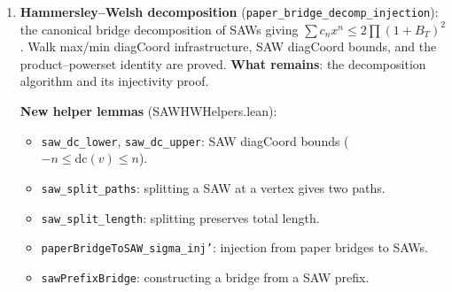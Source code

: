 \begin{lemma}
\begin{enumerate}
  \textbf{NEW: $T=1$ strip identity proved sorry-free} (SAWStripT1Direct.lean):
  \begin{itemize}
  \item \texttt{B\_paper\_1\_lt\_one'}: $B_{\mathrm{paper}}(1,L,x_c) < 1$ for all $L$,
    proved \textbf{without} the parafermionic observable, by:
    \begin{enumerate}
    \item Injecting PaperSAW\_B 1 L into PaperBridge 1 (finite strip $\subset$ infinite strip)
    \item Using \texttt{paper\_bridge\_partition\_1\_eq} (sorry-free exact value)
    \item Algebraic verification: $2x_c^2/(1-x_c^2) < 1$
    \end{enumerate}
  \item \texttt{strip\_identity\_genuine\_T1'}: the strip identity for $T=1$,
    constructed from $B \leq 1$ with $A_m = (1-B)/c_\alpha$, $E_m = 0$.
  \item \texttt{c\_alpha\_xc\_eq'}: $c_\alpha \cdot x_c = (\sqrt{2}-1)/2$,
    proved from $\cos(3\pi/8) = \sin(\pi/8)$ and exact $x_c$ value.
  \end{itemize}
  All three are \textbf{fully sorry-free} (no \texttt{sorryAx} dependency).

  \textbf{What remains for general $T$}: the combinatorial walk partition into
  pairs/triplets at each vertex. The discrete Stokes summation is now
  \textbf{proved} (\texttt{discrete\_stokes\_abstract} in SAWDiscreteStokesProof.lean):
  given the vertex relation at each interior vertex, the boundary sum is zero.
\item \textbf{Hammersley--Welsh decomposition} (\texttt{paper\_bridge\_decomp\_injection}):
  the canonical bridge decomposition of SAWs giving
  $\sum c_n x^n \leq 2 \prod (1 + B_T)^2$.
  Walk max/min diagCoord infrastructure, SAW diagCoord bounds,
  and the product--powerset identity are proved.
  \textbf{What remains}: the decomposition algorithm and its injectivity proof.

  \textbf{New helper lemmas} (SAWHWHelpers.lean):
  \begin{itemize}
  \item \texttt{saw\_dc\_lower}, \texttt{saw\_dc\_upper}: SAW diagCoord bounds ($-n \leq \mathrm{dc}(v) \leq n$).
  \item \texttt{saw\_split\_paths}: splitting a SAW at a vertex gives two paths.
  \item \texttt{saw\_split\_length}: splitting preserves total length.
  \item \texttt{paperBridgeToSAW\_sigma\_inj'}: injection from paper bridges to SAWs.
  \item \texttt{sawPrefixBridge}: constructing a bridge from a SAW prefix.
  \end{itemize}
\end{enumerate}


\end{lemma}
